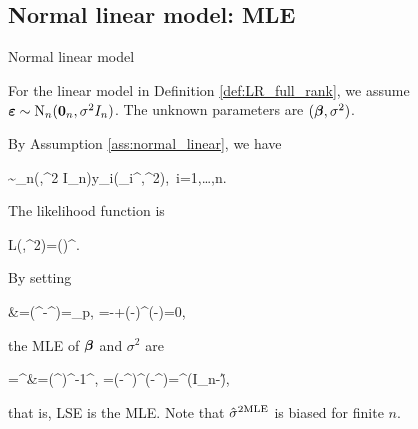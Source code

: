 \documentclass[10pt,a4paper]{book}
\begin{document}
\subsection{Normal linear model: MLE}\label{sec:LR_full_rank_normal}
\begin{assbox}{Normal linear model}
	\begin{assumption}\label{ass:normal_linear}
		For the linear model in Definition \ref{def:LR_full_rank}, we assume ${\boldsymbol\varepsilon}\sim\mathrm{N}_n({\boldsymbol 0}_n,\sigma^2 I_n)$. 
		The unknown parameters are $({\boldsymbol\beta},\sigma^2)$.  
	\end{assumption}
\end{assbox}
By Assumption \ref{ass:normal_linear}, we have 
\begin{salign*}
	\Y\sim\rmN_n(\X\bab,\sigma^2 I_n)\qquad \Longleftrightarrow\qquad y_i\simiid \rmN(\x_i^\TT\bab,\sigma^2),\ i=1,\ldots,n.
\end{salign*}
The likelihood function is 
\begin{sequation*}
	L(\bab,\sigma^2)=\left(\right)^{}\exp{}.
\end{sequation*}
By setting
\begin{salign*}
	&=(^\top{}-^\top{}\boldsymbol{\beta})=\0_p, \qquad {}=-+(\Y-\X\bab)^\top(\Y-\X\bab)=0,
\end{salign*}
the MLE of ${\boldsymbol\beta}$ and $\sigma^2$ are 
\begin{salign}\label{eq:LR_full_rank_MLE}
	\hat{\bab}=\hat{\bab}^{\MLE}&=(\X^\TT\X)^{-1}\X^\TT\Y, \qquad {\hat{\sigma}^{2\MLE}}=(\Y-\X\hat{\bab}^{\MLE})^{\TT}(\Y-\X\hat{\bab}^{\MLE})=\Y^{\TT}(I_n-\H)\Y,
\end{salign}  
that is, LSE is the MLE.
Note that ${\hat{\sigma}^{2\mathrm{MLE}}}$ is biased for finite $n$. 
\end{document}
